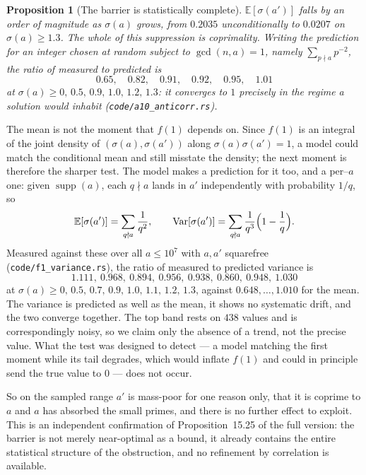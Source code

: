 \documentclass[11pt]{article}
\newtheorem{proposition}[theorem]{Proposition}
\theoremstyle{definition}
\begin{document}
\begin{proposition}[The barrier is statistically complete]\label{prop:anticorr}
$\mathbb{E}[\sigma(a')]$ falls by an order of magnitude as $\sigma(a)$ grows, from $0.2035$
unconditionally to $0.0207$ on $\sigma(a)\ge1.3$. The whole of this suppression is coprimality.
Writing the prediction for an integer chosen at random subject to $\gcd(n,a)=1$, namely
$\sum_{p\nmid a}p^{-2}$, the ratio of measured to predicted is
\[ 0.65,\quad 0.82,\quad 0.91,\quad 0.92,\quad 0.95,\quad 1.01 \]
at $\sigma(a)\ge0,\,0.5,\,0.9,\,1.0,\,1.2,\,1.3$: it converges to $1$ precisely in the regime a
solution would inhabit \textup{(\texttt{code/a10\_anticorr.rs})}.
\end{proposition}

The mean is not the moment that $f(1)$ depends on. Since $f(1)$ is an integral of the joint density
of $(\sigma(a),\sigma(a'))$ along $\sigma(a)\sigma(a')=1$, a model could match the conditional mean
and still misstate the density; the next moment is therefore the sharper test. The model makes a
prediction for it too, and a per--$a$ one: given $\operatorname{supp}(a)$, each $q\nmid a$ lands in
$a'$ independently with probability $1/q$, so
\[ \mathbb{E}[\sigma(a')]=\sum_{q\nmid a}\frac1{q^{2}},\qquad
   \operatorname{Var}[\sigma(a')]=\sum_{q\nmid a}\frac1{q^{3}}\Bigl(1-\frac1q\Bigr). \]
Measured against these over all $a\le10^{7}$ with $a,a'$ squarefree
\textup{(\texttt{code/f1\_variance.rs})}, the ratio of measured to predicted variance is
\[ 1.111,\ 0.968,\ 0.894,\ 0.956,\ 0.938,\ 0.860,\ 0.948,\ 1.030 \]
at $\sigma(a)\ge0,\,0.5,\,0.7,\,0.9,\,1.0,\,1.1,\,1.2,\,1.3$, against $0.648,\dots,1.010$ for the
mean. The variance is predicted as well as the mean, it shows no systematic drift, and the two
converge together. The top band rests on $438$ values and is correspondingly noisy, so we claim only
the absence of a trend, not the precise value. What the test was designed to detect --- a model
matching the first moment while its tail degrades, which would inflate $f(1)$ and could in principle
send the true value to $0$ --- does not occur.

So on the sampled range $a'$ is mass-poor for one reason only, that it is coprime to $a$ and $a$ has
absorbed the small primes, and there is no further effect to exploit. This is an independent
confirmation of Proposition~15.25 of the full version: the barrier is not merely near-optimal as a bound, it
already contains the entire statistical structure of the obstruction, and no refinement by
correlation is available.
\end{document}
